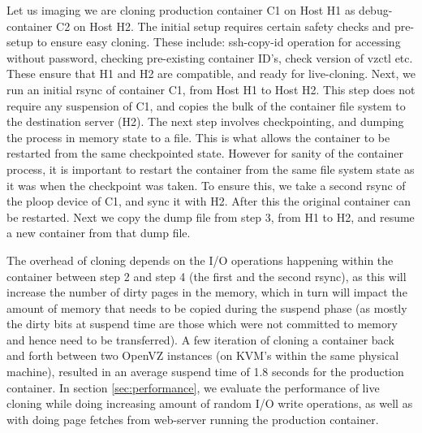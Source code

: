 \begin{example}
Let us imaging we are cloning production container C1 on Host H1 as debug-container C2 on Host H2. 
The initial setup requires certain safety checks and pre-setup to ensure easy cloning. These include: ssh-copy-id operation for accessing without password, checking pre-existing container ID's, check version of vzctl etc. 
These ensure that H1 and H2 are compatible, and ready for live-cloning.
Next, we run an initial rsync of container C1, from Host H1 to Host H2. 
This step does not require any suspension of C1, and copies the bulk of the container file system to the destination server (H2). 
The next step involves checkpointing, and dumping the process in memory state to a file.
This is what allows the container to be restarted from the same checkpointed state. 
However for sanity of the container process, it is important to restart the container from the same file system state as it was when the checkpoint was taken.
To ensure this, we take a second rsync of the ploop device of C1, and sync it with H2.
After this the original container can be restarted.
Next we copy the dump file from step 3, from H1 to H2, and resume a new container from that dump file.
\end{example}

The overhead of cloning depends on the I/O operations happening within the container between step 2 and step 4 (the first and the second rsync), as this will increase the number of dirty pages in the memory, which in turn will impact the amount of memory that needs to be copied during the suspend phase (as mostly the dirty bits at suspend time are those which were not committed to memory and hence need to be transferred).  
A few iteration of cloning a container back and forth between two OpenVZ instances (on KVM's within the same physical machine), resulted in an average suspend time of 1.8 seconds for the production container.
In section \ref{sec:performance}, we evaluate the performance of live cloning while doing increasing amount of random I/O write operations, as well as with doing page fetches  from web-server running the production container.

